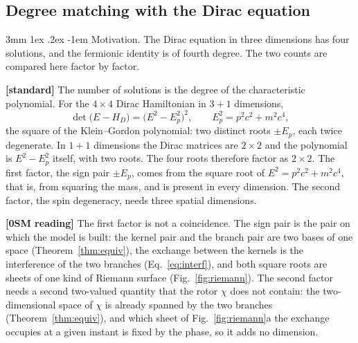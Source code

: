 \documentclass[%
 reprint, amsmath,amssymb, aps, prb, ]{revtex4-2}
\makeatletter
\numberwithin{equation}{section}
\renewcommand\paragraph{%
  \@startsection{paragraph}{4}{\z@}%
    {3mm \@plus 1ex \@minus .2ex}
    {-1em}
    {\normalfont\normalsize\itshape}}
\makeatother
\begin{document}
\subsection{Degree matching with the Dirac equation}

\paragraph{Motivation.} The Dirac equation in three dimensions has four solutions, and the fermionic identity is of fourth degree. The two counts are compared here factor by factor.

\textbf{[standard]} The number of solutions is the degree of the characteristic polynomial. For the $4\times4$ Dirac Hamiltonian in $3+1$ dimensions,
\begin{equation}
\det\!\big(E-H_D\big)=\big(E^2-E_p^2\big)^2,\qquad E_p^2=p^2c^2+m^2c^4 ,
\label{eq:charpoly}
\end{equation}
the square of the Klein--Gordon polynomial: two distinct roots $\pm E_p$, each twice degenerate. In $1+1$ dimensions the Dirac matrices are $2\times2$ and the polynomial is $E^2-E_p^2$ itself, with two roots. The four roots therefore factor as $2\times2$. The first factor, the sign pair $\pm E_p$, comes from the square root of $E^2=p^2c^2+m^2c^4$, that is, from squaring the mass, and is present in every dimension. The second factor, the spin degeneracy, needs three spatial dimensions.

\textbf{[0SM reading]} The first factor is not a coincidence. The sign pair is the pair on which the model is built: the kernel pair and the branch pair are two bases of one space (Theorem~\ref{thm:equiv}), the exchange between the kernels is the interference of the two branches (Eq.~\eqref{eq:interf}), and both square roots are sheets of one kind of Riemann surface (Fig.~\ref{fig:riemann}). The second factor needs a second two-valued quantity that the rotor $\chi$ does not contain: the two-dimensional space of $\chi$ is already spanned by the two branches (Theorem~\ref{thm:equiv}), and which sheet of Fig.~\ref{fig:riemann}a the exchange occupies at a given instant is fixed by the phase, so it adds no dimension.
\end{document}
